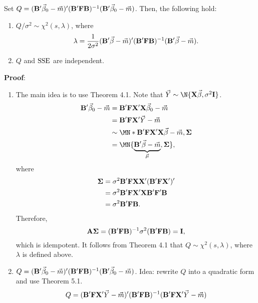 \begin{Theorem}{}{}
    Set $ Q=(\mathbf{B}'\vec{\beta}_0-\vec{m})'(\mathbf{B}'\mathbf{F}\mathbf{B})^{-1}(\mathbf{B}'\vec{\beta}_0-\vec{m}) $.
    Then, the following hold:
    \begin{enumerate}[(1)]
        \item $ Q/\sigma^2 \sim \chi^2(s,\lambda) $, where
              \[ \lambda=\frac{1}{2\sigma^2}(\mathbf{B}'\vec{\beta}-\vec{m})'(\mathbf{B}'\mathbf{F}\mathbf{B})^{-1}(\mathbf{B}'\vec{\beta}-\vec{m}). \]
        \item $ Q $ and $ \text{SSE} $ are independent.
    \end{enumerate}
    \tcblower{}
    \textbf{Proof}:
    \begin{enumerate}[(1)]
        \item The main idea is to use Theorem 4.1.
              Note that $ \Vector{Y}\sim \N{\Matrix{X}\Vector{\beta},\sigma^2 \Matrix{I}} $.
              \begin{align*}
                  \Matrix{B}'\Vector{\beta}_0-\Vector{m}
                   & =\Matrix{B}'\Matrix{F}\Matrix{X}'\Matrix{X}\Vector{\beta}_0-\Vector{m}                        \\
                   & =\Matrix{B}'\Matrix{F}\Matrix{X}'\Vector{Y}-\Vector{m}                                        \\
                   & \sim\MN*{\Matrix{B}'\Matrix{F}\Matrix{X}'\Matrix{X}\Vector{\beta}-\Vector{m},\Matrix{\Sigma}} \\
                   & =\MN{\underbrace{\Matrix{B}'\Vector{\beta}-\Vector{m}}_{\Vector{\mu}},\Matrix{\Sigma}},
              \end{align*}
              where
              \begin{align*}
                  \mathbf{\Sigma}
                   & =\sigma^2 \mathbf{B}'\mathbf{F}\mathbf{X}\mathbf{X}'(\mathbf{B}'\mathbf{F}\mathbf{X}')' \\
                   & =\sigma^2 \mathbf{B}'\mathbf{F}\mathbf{X}'\mathbf{X}\mathbf{B}'\mathbf{F}'\mathbf{B}    \\
                   & =\sigma^2 \mathbf{B}'\mathbf{F}\mathbf{B}.
              \end{align*}
              Therefore,
              \[ \mathbf{A}\mathbf{\Sigma}=(\mathbf{B}'\mathbf{F}\mathbf{B})^{-1}\sigma^2(\mathbf{B}'\mathbf{F}\mathbf{B})=\mathbf{I}, \]
              which is idempotent. It follows from Theorem 4.1 that $ Q \sim \chi^2(s,\lambda) $,
              where $ \lambda $ is defined above.
        \item $ Q=(\mathbf{B}'\vec{\beta}_0-\vec{m})'(\mathbf{B}'\mathbf{F}\mathbf{B})^{-1}(\mathbf{B}'\vec{\beta}_0-\vec{m}) $.
              Idea: rewrite $ Q $ into a quadratic form and use Theorem 5.1.
              \[ Q=(\mathbf{B}'\mathbf{F}\mathbf{X}'\vec{Y}-\vec{m})'(\mathbf{B}'\mathbf{F}\mathbf{B})^{-1}(\mathbf{B}'\mathbf{F}\mathbf{X}'\vec{Y}-\vec{m}) \]


\end{enumerate}
\end{Theorem}
